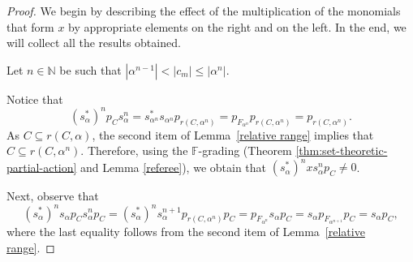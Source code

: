 \documentclass[a4paper,12pt]{amsart}
\theoremstyle{definition}
\theoremstyle{remark}
\numberwithin{equation}{section}
\newcommand{\N}{\mathbb{N}}
\newcommand{\F}{\mathbb{F}}
\begin{document}
\begin{proof}
We begin by describing the effect of the multiplication of the monomials that form $x$ by appropriate elements on the right and on the left. In the end, we will collect all the results obtained. 

Let $n\in \N$ be such that $|\alpha^{n-1}|<|c_m|\leq |\alpha^n|$.

Notice that $$(s_\alpha^*)^np_C s_\alpha^n=s_{\alpha^n}^* s_{\alpha^n}p_{r(C,\alpha^n)}=p_{F_{\alpha^n}}p_{r(C,\alpha^n)}=p_{r(C,\alpha^n)}.$$ 
As $C\subseteq r(C,\alpha)$, the second item of Lemma~\ref{relative range} implies that $C\subseteq r(C,\alpha^n)$. Therefore, using the $\F$-grading (Theorem \ref{thm:set-theoretic-partial-action} and Lemma \ref{referee}), we obtain that $(s_{\alpha}^*)^n xs_\alpha^n p_C \neq 0$.

Next, observe that 
$$(s_\alpha^*)^ns_\alpha p_C s_\alpha^n p_C=(s_\alpha^*)^ns_\alpha^{n+1}p_{r(C,\alpha^n)}p_C=p_{F_{\alpha^n}}s_{\alpha}p_C=s_\alpha p_{F_{\alpha^{n+1}}}p_C=s_\alpha p_C,$$
where the last equality follows from the second item of Lemma~\ref{relative range}.


\end{proof}
\end{document}
